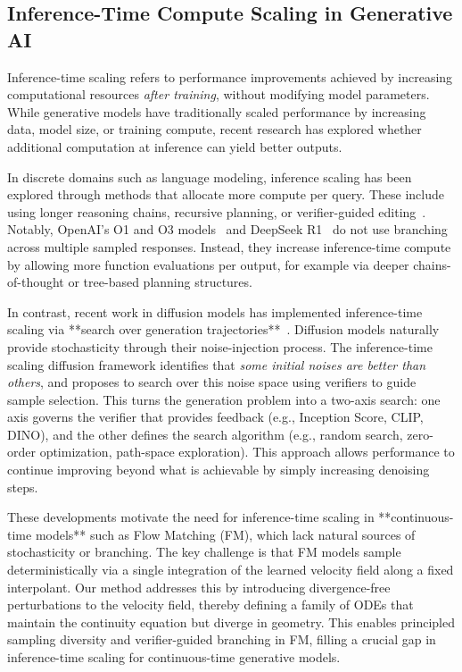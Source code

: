 \documentclass{article}
\begin{document}
\subsection{Inference-Time Compute Scaling in Generative AI}

Inference-time scaling refers to performance improvements achieved by increasing computational resources \emph{after training}, without modifying model parameters. While generative models have traditionally scaled performance by increasing data, model size, or training compute, recent research has explored whether additional computation at inference can yield better outputs.

In discrete domains such as language modeling, inference scaling has been explored through methods that allocate more compute per query. These include using longer reasoning chains, recursive planning, or verifier-guided editing~\cite{gandhi2024sos, cobbe2021verifiers, lightman2023verify, brown2024llmmonkeys}. Notably, OpenAI's O1 and O3 models~\cite{openai2024o1} and DeepSeek R1~\cite{deepseek2024r1} do not use branching across multiple sampled responses. Instead, they increase inference-time compute by allowing more function evaluations per output, for example via deeper chains-of-thought or tree-based planning structures.

In contrast, recent work in diffusion models has implemented inference-time scaling via **search over generation trajectories**~\cite{ma2025diffits}. Diffusion models naturally provide stochasticity through their noise-injection process. The inference-time scaling diffusion framework identifies that \emph{some initial noises are better than others}, and proposes to search over this noise space using verifiers to guide sample selection. This turns the generation problem into a two-axis search: one axis governs the verifier that provides feedback (e.g., Inception Score, CLIP, DINO), and the other defines the search algorithm (e.g., random search, zero-order optimization, path-space exploration). This approach allows performance to continue improving beyond what is achievable by simply increasing denoising steps.

These developments motivate the need for inference-time scaling in **continuous-time models** such as Flow Matching (FM), which lack natural sources of stochasticity or branching. The key challenge is that FM models sample deterministically via a single integration of the learned velocity field along a fixed interpolant. Our method addresses this by introducing divergence-free perturbations to the velocity field, thereby defining a family of ODEs that maintain the continuity equation but diverge in geometry. This enables principled sampling diversity and verifier-guided branching in FM, filling a crucial gap in inference-time scaling for continuous-time generative models.
\end{document}
